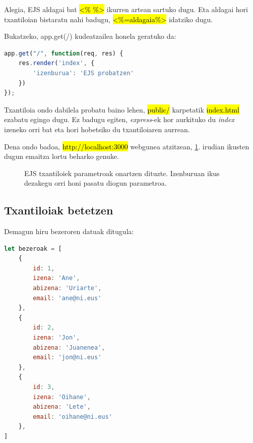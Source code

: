 Alegia, EJS aldagai bat \hl{<\% \%>} ikurren artean sartuko dugu. Eta aldagai hori txantiloian bistaratu nahi badugu, \hl{<\%=aldagaia\%> } idatziko dugu.

Bukatzeko, app.get(\textquotesingle{}/\textquotesingle{}) kudeatzailea honela geratuko da:

\begin{lstlisting}[language=JavaScript]
app.get("/", function(req, res) {
    res.render('index', {
        'izenburua': 'EJS probatzen'    
    }) 
});
\end{lstlisting}

Txantiloia ondo dabilela probatu baino lehen, \hl{public/} karpetatik \hl{index.html} ezabatu egingo dugu. Ez badugu egiten, \textit{express}-ek hor aurkituko du \textit{index} izeneko orri bat eta hori hobetsiko du txantiloiaren aurrean. 

Dena ondo badoa, \hl{http://localhost:3000} webgunea atzitzean, \ref{fig:txantiloia-ejs}. irudian ikusten dugun emaitza lortu beharko genuke.

\begin{figure}[ht]
	\centering
{}
\caption{EJS txantiloiek parametroak onartzen dituzte. Izenburuan ikus dezakegu orri honi pasatu diogun parametroa.}
\label{fig:txantiloia-ejs}
\end{figure}

\subsection{Txantiloiak betetzen}

Demagun hiru bezeroren datuak ditugula:

\begin{lstlisting}[language=JavaScript]
let bezeroak = [
    {
        id: 1,
        izena: 'Ane',
        abizena: 'Uriarte',
        email: 'ane@ni.eus'
    },
    {
        id: 2,
        izena: 'Jon',
        abizena: 'Juanenea',
        email: 'jon@ni.eus'
    },
    {
        id: 3,
        izena: 'Oihane',
        abizena: 'Lete',
        email: 'oihane@ni.eus'
    },
]
\end{lstlisting}

